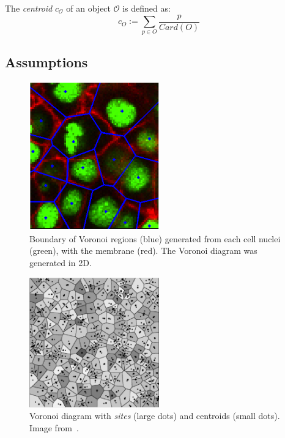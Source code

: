 The \emph{centroid} \({c_\mathcal{O}}\) of an object \({\mathcal{O}}\) is defined as:
\[
c_O :=  \sum_{p \in {O}} \frac{p}{Card(O)}
\]


\subsection{Assumptions}

\begin{figure}[h]
\begin{center}
\leavevmode
\includegraphics[width=0.5\textwidth]{pictures/voronoiExample2D}
\end{center}
\caption{Boundary of Voronoi regions (blue) generated from each cell nuclei (green), with the membrane (red). The Voronoi  diagram was generated in 2D.}
\label{fig:voronoiExample2D}
\end{figure}

\begin{figure}[h]
\begin{center}
\leavevmode
\includegraphics[width=0.5\textwidth]{pictures/centroidVoronoi}
\end{center}
\caption{Voronoi diagram with \emph{sites} (large dots) and centroids (small dots). Image from~\cite{Secord02randommarks}.}
\label{fig:centroidVoronoi}
\end{figure}


